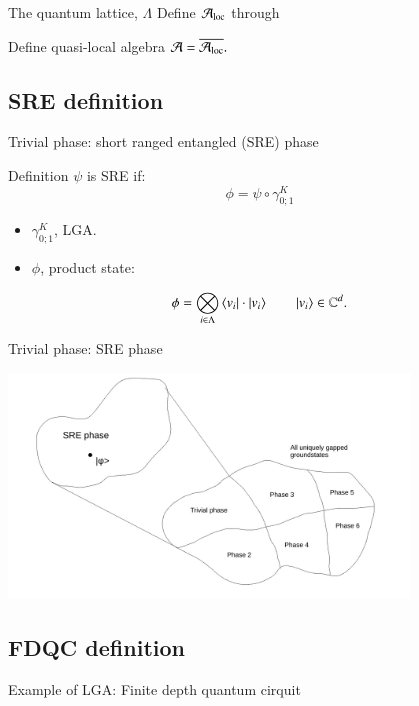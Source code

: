 \documentclass{beamer}
\begin{document}
\begin{frame}{The quantum lattice, $\Lambda$}
	Define $\AA_{\text{loc}}$ through
	\begin{center}
		
	\end{center}
	\pause
	Define quasi-local algebra $\AA=\overline{\AA_{\text{loc}}}.$
\end{frame}

\subsection{SRE definition}

\begin{frame}{Trivial phase: short ranged entangled (SRE) phase}
	\begin{block}{Definition}
		$\psi$ is SRE if:
		\[\phi=\psi\circ \gamma^K_{0;1}\]
		\begin{itemize}
			\item $\gamma^K_{0;1}$, LGA.
			\item $\phi$, product state:
		\end{itemize}
		\[\phi=\bigotimes_{i\in\Lambda}\bra{v_i}\cdot\ket{v_i}\qquad \ket{v_i}\in\CC^d.\]
	\end{block}
\end{frame}

\begin{frame}{Trivial phase: SRE phase}
	\begin{center}
		\includegraphics[trim={1.5cm 0 2cm 0},clip,width=0.8\textwidth]{Figures/SRE_Phase.pdf}
	\end{center}
\end{frame}

\subsection{FDQC definition}

\begin{frame}{Example of LGA: Finite depth quantum cirquit}
	\begin{center}
		
	\end{center}
\end{frame}
\end{document}
